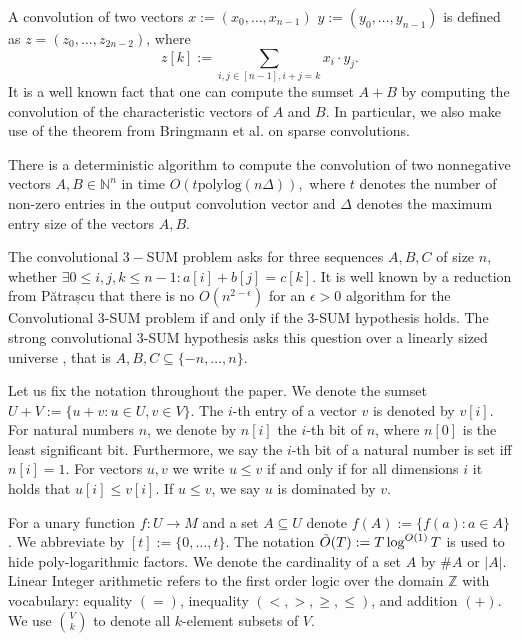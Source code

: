 A convolution of two vectors $x:=(x_0, \dots,x_{n-1})$ $y:=(y_0, \dots, y_{n-1})$
is defined as $z=(z_0, \dots,z_{2n-2})$, where $$z[k]:= \sum_{i,j \in [n-1], i+j=k} x_i \cdot y_j.$$ It is a well known fact that one can compute 
the sumset $A+B$ by computing the convolution of the characteristic vectors of $A$ and $B$.
In particular, we also make use of the theorem from Bringmann et al. \cite{DBLP:journals/corr/abs-2107-07625} on sparse convolutions.
\begin{theorem}
There is a deterministic algorithm to compute the convolution of two nonnegative vectors $A,B \in \mathbb{N}^n$ in time $O(t \text{polylog}(n \Delta)),$ where 
$t$ denotes the number of non-zero entries in the output convolution vector and $\Delta$ denotes the maximum entry size of the vectors $A,B$.
\label{sprase_conv}
\end{theorem}

The convolutional $3-$SUM problem asks for three sequences $A,B,C$ of size $n$, whether $\exists 0\leq i, j, k \leq n-1: a[i]+b[j]=c[k]$.
It is well known by a reduction from Pătrașcu \cite{DBLP:conf/stoc/Patrascu10} that there is no $O(n^{2-\epsilon})$ for an $\epsilon>0$ algorithm  for the Convolutional 3-SUM problem if and only if the 3-SUM hypothesis holds. 
The strong convolutional $3$-SUM hypothesis asks this question over a linearly sized universe \cite{DBLP:conf/icalp/AmirCLL14}, that is $A,B,C \subseteq \{-n,\dots,n\}.$ 


Let us fix the notation throughout the paper. We denote the sumset $U+V:= \{u+v: u \in U,v  \in V\}$. The $i$-th entry
of a vector $v$ is denoted by $v[i]$. For natural numbers $n$, we denote by $n[i]$ the $i$-th bit of $n$, where $n[0]$ is the least significant bit. Furthermore, we say the $i$-th bit of a natural number is set iff $n[i]=1.$
For vectors $u,v$ we write $u \leq v$ if and only if for all dimensions $i$ it holds that $u[i] \leq v[i]$. If $u \leq v$, we say $u$ is dominated by $v$.

For a unary function $f: U \to M$ and a set $A \subseteq U$ denote $f(A):= \{f(a): a\in A\}$. We abbreviate by $[t]:= \{0,\dots,t\}$. 
The notation $\Tilde{O}(T):=T \log^{O(1)}T$ is used
to hide poly-logarithmic factors. We denote the cardinality of a set $A$ by $\# A$ or $|A|$. Linear Integer arithmetic refers to the first order logic over the domain $\mathbb{Z}$ with
vocabulary: equality $(=)$,  inequality $(<,>,\geq,\leq)$,  and addition $(+)$. We use $\binom{V}{k}$ to denote all $k$-element subsets of $V$.

